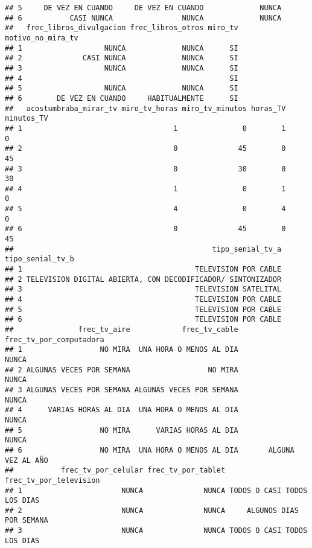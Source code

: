 \documentclass[
]{article}
\begin{document}
\begin{verbatim}
## 5     DE VEZ EN CUANDO     DE VEZ EN CUANDO             NUNCA
## 6           CASI NUNCA                NUNCA             NUNCA
##   frec_libros_divulgacion frec_libros_otros miro_tv motivo_no_mira_tv
## 1                   NUNCA             NUNCA      SI                  
## 2              CASI NUNCA             NUNCA      SI                  
## 3                   NUNCA             NUNCA      SI                  
## 4                                                SI                  
## 5                   NUNCA             NUNCA      SI                  
## 6        DE VEZ EN CUANDO     HABITUALMENTE      SI                  
##   acostumbraba_mirar_tv miro_tv_horas miro_tv_minutos horas_TV minutos_TV
## 1                                   1               0        1          0
## 2                                   0              45        0         45
## 3                                   0              30        0         30
## 4                                   1               0        1          0
## 5                                   4               0        4          0
## 6                                   0              45        0         45
##                                              tipo_senial_tv_a tipo_senial_tv_b
## 1                                        TELEVISION POR CABLE                 
## 2 TELEVISION DIGITAL ABIERTA, CON DECODIFICADOR/ SINTONIZADOR                 
## 3                                        TELEVISION SATELITAL                 
## 4                                        TELEVISION POR CABLE                 
## 5                                        TELEVISION POR CABLE                 
## 6                                        TELEVISION POR CABLE                 
##               frec_tv_aire            frec_tv_cable frec_tv_por_computadora
## 1                  NO MIRA  UNA HORA O MENOS AL DIA                   NUNCA
## 2 ALGUNAS VECES POR SEMANA                  NO MIRA                   NUNCA
## 3 ALGUNAS VECES POR SEMANA ALGUNAS VECES POR SEMANA                   NUNCA
## 4      VARIAS HORAS AL DIA  UNA HORA O MENOS AL DIA                   NUNCA
## 5                  NO MIRA      VARIAS HORAS AL DIA                   NUNCA
## 6                  NO MIRA  UNA HORA O MENOS AL DIA       ALGUNA VEZ AL AÑO
##           frec_tv_por_celular frec_tv_por_tablet      frec_tv_por_television
## 1                       NUNCA              NUNCA TODOS O CASI TODOS LOS DIAS
## 2                       NUNCA              NUNCA     ALGUNOS DIAS POR SEMANA
## 3                       NUNCA              NUNCA TODOS O CASI TODOS LOS DIAS

\end{verbatim}
\end{document}
